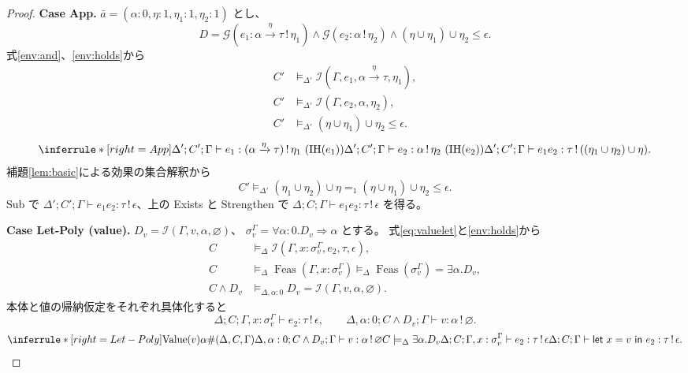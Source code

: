 \documentclass[a4paper,11pt]{article}
\theoremstyle{definition}
\newenvironment{Case}[1]{\par\smallskip\noindent\textbf{Case #1.}\enspace\ignorespaces}{\par}
\newcommand{\emp}{\varnothing}
\newcommand{\jj}[6]{#1;#2;#3\vdash #4:#5\,!\,#6}
\newcommand{\J}[3]{\jj{\Delta}{C}{\Gamma}{#1}{#2}{#3}}
\newcommand{\lete}[3]{\mathsf{let}\ #1=#2\ \mathsf{in}\ #3}
\newcommand{\Feas}{\operatorname{Feas}}
\newcommand{\Val}{\operatorname{Value}}
\begin{document}
\begin{proof}
\begin{Case}{App}
$\bar a=(\alpha:0,\eta:1,\eta_1:1,\eta_2:1)$ とし、
\[
 D=\mathcal G(e_1:\alpha\xrightarrow\eta\tau\,!\,\eta_1)
 \land\mathcal G(e_2:\alpha\,!\,\eta_2)
 \land(\eta\cup\eta_1)\cup\eta_2\leq\epsilon.
\]
式\eqref{env:and}、\eqref{env:holds}から
\begin{align*}
 C'&\models_{\Delta'}\mathcal I(\Gamma,e_1,\alpha\xrightarrow\eta\tau,\eta_1),\\
 C'&\models_{\Delta'}\mathcal I(\Gamma,e_2,\alpha,\eta_2),\\
 C'&\models_{\Delta'}(\eta\cup\eta_1)\cup\eta_2\leq\epsilon.
\end{align*}
\[
 \inferrule*[right=App]{
 \jj{\Delta'}{C'}\Gamma{e_1}{(\alpha\xrightarrow\eta\tau)}{\eta_1}\ (\mathrm{IH}(e_1))\\
 \jj{\Delta'}{C'}\Gamma{e_2}\alpha{\eta_2}\ (\mathrm{IH}(e_2))}
 {\jj{\Delta'}{C'}\Gamma{e_1e_2}\tau{((\eta_1\cup\eta_2)\cup\eta)}}.
\]
補題\ref{lem:basic}による効果の集合解釈から
\[
 C'\models_{\Delta'}(\eta_1\cup\eta_2)\cup\eta
 =_1(\eta\cup\eta_1)\cup\eta_2\leq\epsilon.
\]
Sub で $\jj{\Delta'}{C'}\Gamma{e_1e_2}\tau\epsilon$、上の Exists と Strengthen で
$\J{e_1e_2}\tau\epsilon$ を得る。
\end{Case}

\begin{Case}{Let-Poly (value)}
$D_v=\mathcal I(\Gamma,v,\alpha,\emp)$、
$\sigma_v^\Gamma=\forall\alpha:0.D_v\Rightarrow\alpha$ とする。
式\eqref{eq:valuelet}と\eqref{env:holds}から
\begin{align*}
 C&\models_\Delta\mathcal I(\Gamma,x:\sigma_v^\Gamma,e_2,\tau,\epsilon),\\
 C&\models_\Delta\Feas(\Gamma,x:\sigma_v^\Gamma)
 \models_\Delta\Feas(\sigma_v^\Gamma)=\exists\alpha.D_v,\\
 C\land D_v&\models_{\Delta,\alpha:0}D_v
 =\mathcal I(\Gamma,v,\alpha,\emp).
\end{align*}
本体と値の帰納仮定をそれぞれ具体化すると
\[
 \jj\Delta C{\Gamma,x:\sigma_v^\Gamma}{e_2}\tau\epsilon,
 \qquad\jj{\Delta,\alpha:0}{C\land D_v}\Gamma v\alpha\emp.
\]
\[
 \inferrule*[right=Let-Poly]{\Val(v)\\\alpha\#(\Delta,C,\Gamma)\\
 \jj{\Delta,\alpha:0}{C\land D_v}\Gamma v\alpha\emp\\
 C\models_\Delta\exists\alpha.D_v\\
 \jj\Delta C{\Gamma,x:\sigma_v^\Gamma}{e_2}\tau\epsilon}
 {\J{\lete x v{e_2}}\tau\epsilon}.
\]
\end{Case}


\end{proof}
\end{document}
